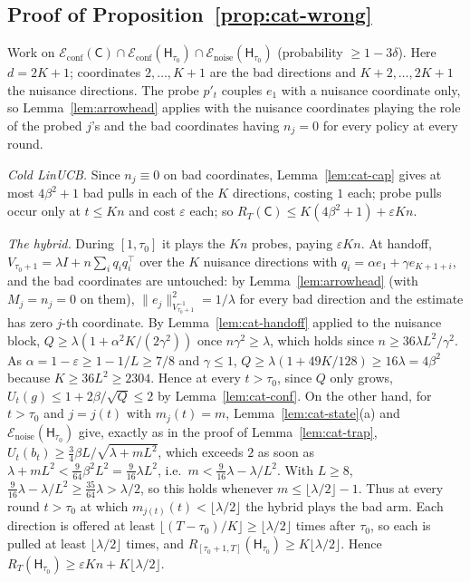 \documentclass[anon]{alt2027} %
\newcommand{\eps}{\varepsilon}
\newcommand{\Cold}{\mathsf{C}}
\newcommand{\Hyb}{\mathsf{H}}
\begin{document}
\subsection{Proof of Proposition~\ref{prop:cat-wrong}}

Work on $\mathcal E_{\mathrm{conf}}(\Cold)\cap\mathcal E_{\mathrm{conf}}(\Hyb_{\tau_0})\cap\mathcal E_{\mathrm{noise}}(\Hyb_{\tau_0})$
(probability $\ge1-3\delta$). Here $d=2K+1$; coordinates $2,\dots,K+1$ are the
bad directions and $K+2,\dots,2K+1$ the nuisance directions. The probe $p'_t$
couples $e_1$ with a nuisance coordinate only, so Lemma~\ref{lem:arrowhead}
applies with the nuisance coordinates playing the role of the probed $j$'s
and the bad coordinates having $n_j=0$ for every policy at every round.

\emph{Cold LinUCB.} Since $n_j\equiv0$ on bad coordinates,
Lemma~\ref{lem:cat-cap} gives at most $4\beta^2+1$ bad pulls in each of the $K$
directions, costing $1$ each; probe pulls occur only at $t\le Kn$ and cost
$\eps$ each; so $R_T(\Cold)\le K(4\beta^2+1)+\eps Kn$.

\emph{The hybrid.} During $[1,\tau_0]$ it plays the $Kn$ probes, paying $\eps Kn$.
At handoff, $V_{\tau_0+1}=\lambda I+n\sum_{i}q_iq_i^\top$ over the $K$ nuisance
directions with $q_i=\alpha e_1+\gamma e_{K+1+i}$, and the bad coordinates are
untouched: by Lemma~\ref{lem:arrowhead} (with $M_j=n_j=0$ on them),
$\|e_j\|^2_{V_{\tau_0+1}^{-1}}=1/\lambda$ for every bad direction and the estimate
has zero $j$-th coordinate. By Lemma~\ref{lem:cat-handoff} applied to the
nuisance block, $Q\ge\lambda(1+\alpha^2K/(2\gamma^2))$ once $n\gamma^2\ge\lambda$, which holds
since $n\ge36\lambda L^2/\gamma^2$. As $\alpha=1-\eps\ge1-1/L\ge7/8$ and $\gamma\le1$,
$Q\ge\lambda(1+49K/128)\ge16\lambda=4\beta^2$ because $K\ge36L^2\ge2304$. Hence at
every $t>\tau_0$, since $Q$ only grows, $U_t(g)\le1+2\beta/\sqrt Q\le2$ by
Lemma~\ref{lem:cat-conf}. On the other hand, for $t>\tau_0$ and $j=j(t)$ with
$m_j(t)=m$, Lemma~\ref{lem:cat-state}(a) and $\mathcal E_{\mathrm{noise}}(\Hyb_{\tau_0})$
give, exactly as in the proof of Lemma~\ref{lem:cat-trap},
$U_t(b_t)\ge\tfrac34\beta L/\sqrt{\lambda+mL^2}$, which exceeds $2$ as soon as
$\lambda+mL^2<\tfrac9{64}\beta^2L^2=\tfrac9{16}\lambda L^2$, i.e.\ $m<\tfrac9{16}\lambda-\lambda/L^2$.
With $L\ge8$, $\tfrac9{16}\lambda-\lambda/L^2\ge\tfrac{35}{64}\lambda>\lambda/2$, so this holds
whenever $m\le\lfloor\lambda/2\rfloor-1$. Thus at every round $t>\tau_0$ at which
$m_{j(t)}(t)<\lfloor\lambda/2\rfloor$ the hybrid plays the bad arm. Each direction
is offered at least $\lfloor(T-\tau_0)/K\rfloor\ge\lfloor\lambda/2\rfloor$ times after
$\tau_0$, so each is pulled at least $\lfloor\lambda/2\rfloor$ times, and
$R_{[\tau_0+1,T]}(\Hyb_{\tau_0})\ge K\lfloor\lambda/2\rfloor$. Hence
$R_T(\Hyb_{\tau_0})\ge\eps Kn+K\lfloor\lambda/2\rfloor$.
\end{document}
